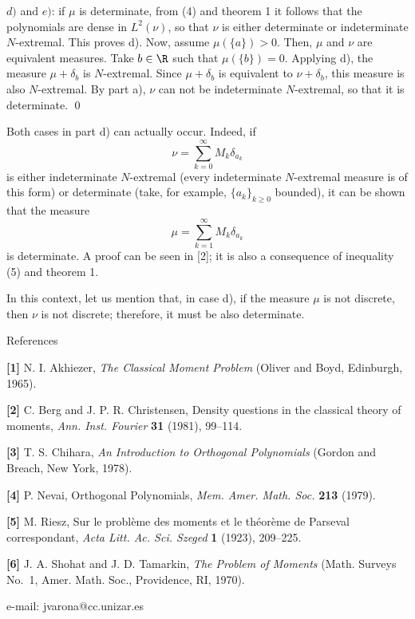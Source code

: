 $d)$ and $e)$: if $\mu$ is determinate, from (4) and theorem 1 it follows that
the polynomials are dense in $L^2(\nu)$, so that $\nu$ is either determinate or
indeterminate $N$-extremal. This proves d). Now, assume $\mu(\{a\}) > 0$. Then,
$\mu$ and $\nu$ are equivalent measures. Take $b \in \R$ such that $\mu(\{b\}) =
0$. Applying d), the measure $\mu + \delta_b$ is $N$-extremal. Since $\mu +
\delta_b$ is equivalent to $\nu + \delta_b$, this measure is also $N$-extremal.
By part a), $\nu$ can not be indeterminate $N$-extremal, so that it is
determinate. \qed

\medskip

 Both cases in part d) can actually occur. Indeed,
if
$$
   \nu = \sum_{k=0}^{\infty} M_k \delta_{a_k}
$$
is either indeterminate $N$-extremal (every indeterminate $N$-extremal measure
is of this form) or determinate (take, for example, $\{a_k\}_{k\geq 0}$
bounded), it can be shown that the measure
$$
   \mu = \sum_{k=1}^{\infty} M_k \delta_{a_k}
$$
is determinate. A proof can be seen in [2]; it is also a consequence of
inequality (5) and theorem 1.

In this context, let us mention that, in case d), if the measure $\mu$ is not
discrete, then $\nu$ is not discrete; therefore, it must be also determinate.

\bigskip

\centerline {\may References}

\bigskip
\frenchspacing

\item {{\bf [1]}} N. I. Akhiezer,
{\it The Classical Moment Problem\/}
(Oliver and Boyd, Edinburgh, 1965).

\item {{\bf [2]}} C. Berg and J. P. R. Christensen,
Density questions in the classical theory of moments,
{\it Ann. Inst. Fourier} {\bf 31} (1981), 99--114.

\item {{\bf [3]}} T. S. Chihara,
{\it An Introduction to Orthogonal Polynomials\/}
(Gordon and Breach, New York, 1978).

\item {{\bf [4]}} P. Nevai,
Orthogonal Polynomials,
{\it Mem. Amer. Math. Soc.} {\bf 213} (1979).

\item {{\bf [5]}} M. Riesz,
Sur le probl\`eme des moments et le th\'eor\`eme de Parseval correspondant,
{\it  Acta Litt. Ac. Sci. Szeged} {\bf 1} (1923), 209--225.

\item {{\bf [6]}} J. A. Shohat and J. D. Tamarkin,
{\it The Problem of Moments\/}
(Math. Surveys No.~1, Amer. Math. Soc., Providence, RI, 1970).

\bigskip


\bigskip

\centerline{e-mail: jvarona@cc.unizar.es}

\bye
